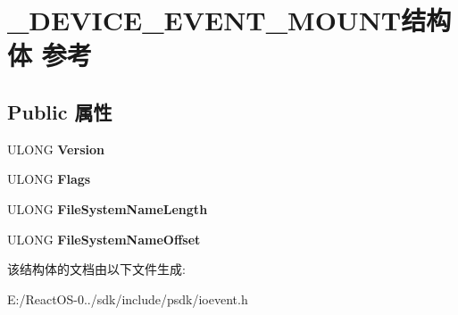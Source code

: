 \hypertarget{struct___d_e_v_i_c_e___e_v_e_n_t___m_o_u_n_t}{}\section{\+\_\+\+D\+E\+V\+I\+C\+E\+\_\+\+E\+V\+E\+N\+T\+\_\+\+M\+O\+U\+N\+T结构体 参考}
\label{struct___d_e_v_i_c_e___e_v_e_n_t___m_o_u_n_t}
\subsection*{Public 属性}
\begin{DoxyCompactItemize}
\item 
\mbox{\label{struct___d_e_v_i_c_e___e_v_e_n_t___m_o_u_n_t_aeb3d9dfaa97bde4ad354792d23d93809}} 
U\+L\+O\+NG {\bfseries Version}
\item 
\mbox{\label{struct___d_e_v_i_c_e___e_v_e_n_t___m_o_u_n_t_afeb2c760684714b7db948abf7309123d}} 
U\+L\+O\+NG {\bfseries Flags}
\item 
\mbox{\label{struct___d_e_v_i_c_e___e_v_e_n_t___m_o_u_n_t_a6ecbb8f18b0a160bc6b3edd6c02487a9}} 
U\+L\+O\+NG {\bfseries File\+System\+Name\+Length}
\item 
\mbox{\label{struct___d_e_v_i_c_e___e_v_e_n_t___m_o_u_n_t_ac07169c575783b35417cf6495001fe6d}} 
U\+L\+O\+NG {\bfseries File\+System\+Name\+Offset}
\end{DoxyCompactItemize}


该结构体的文档由以下文件生成\+:\begin{DoxyCompactItemize}
\item 
E\+:/\+React\+O\+S-\/0../sdk/include/psdk/ioevent.\+h\end{DoxyCompactItemize}
